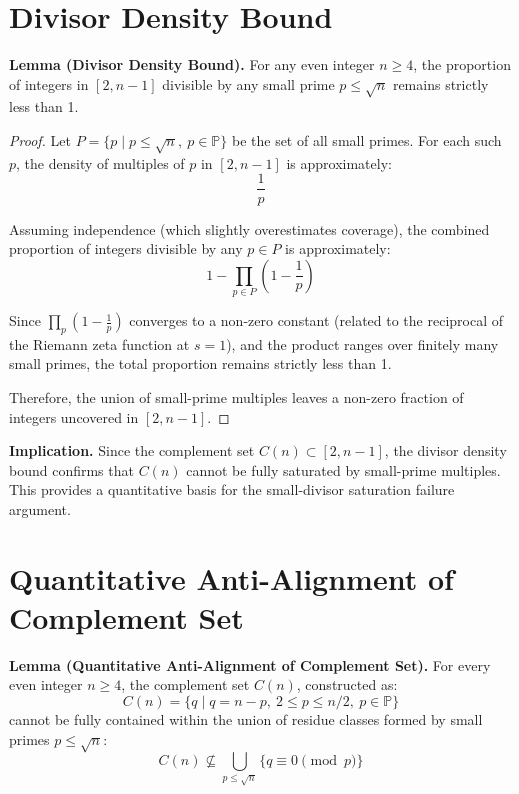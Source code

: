 \documentclass[11pt]{article}
\begin{document}
	
	\section{Divisor Density Bound}
	
	\textbf{Lemma (Divisor Density Bound).}  
	For any even integer \( n \geq 4 \), the proportion of integers in \([2, n-1]\) divisible by any small prime \( p \leq \sqrt{n} \) remains strictly less than 1.
	
	\begin{proof}
		Let \( P = \{ p \mid p \leq \sqrt{n},\ p \in \mathbb{P} \} \) be the set of all small primes. For each such \( p \), the density of multiples of \( p \) in \([2, n-1]\) is approximately:
		\[
		\frac{1}{p}
		\]
		
		Assuming independence (which slightly overestimates coverage), the combined proportion of integers divisible by any \( p \in P \) is approximately:
		\[
		1 - \prod_{p \in P} \left(1 - \frac{1}{p}\right)
		\]
		
		Since \( \prod_{p} \left(1 - \frac{1}{p}\right) \) converges to a non-zero constant (related to the reciprocal of the Riemann zeta function at \( s = 1 \)), and the product ranges over finitely many small primes, the total proportion remains strictly less than 1.
		
		Therefore, the union of small-prime multiples leaves a non-zero fraction of integers uncovered in \([2, n-1]\).
		
	\end{proof}
	
	\textbf{Implication.}  
	Since the complement set \( C(n) \subset [2, n-1] \), the divisor density bound confirms that \( C(n) \) cannot be fully saturated by small-prime multiples. This provides a quantitative basis for the small-divisor saturation failure argument.
	
	
	\section{Quantitative Anti-Alignment of Complement Set}
	
	\textbf{Lemma (Quantitative Anti-Alignment of Complement Set).}  
	For every even integer \( n \geq 4 \), the complement set \( C(n) \), constructed as:
	\[
	C(n) = \{ q \mid q = n - p,\ 2 \leq p \leq n/2,\ p \in \mathbb{P} \}
	\]
	cannot be fully contained within the union of residue classes formed by small primes \( p \leq \sqrt{n} \):
	\[
	C(n) \not\subseteq \bigcup_{p \leq \sqrt{n}} \{ q \equiv 0 \pmod{p} \}
	\]
	
\end{document}
